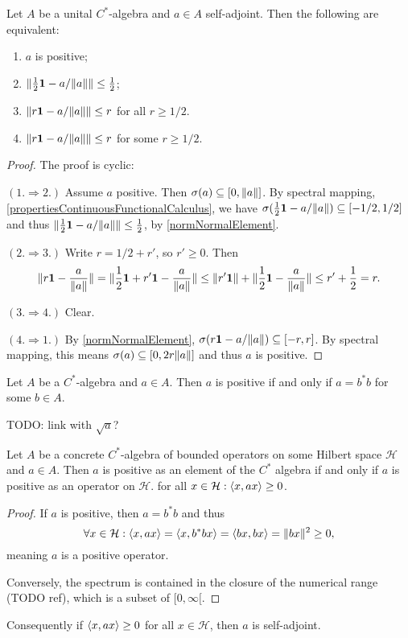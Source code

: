 \begin{lemma} \label{positivityDistanceToNorm}
Let $A$ be a unital $C^*$-algebra and $a\in A$ self-adjoint. Then the following are equivalent:
\begin{enumerate}
\item $a$ is positive;
\item $\lVert\frac{1}{2}\boldsymbol{\mathrm{1}} - a / \lVert a\rVert\rVert \leq \frac{1}{2}$;
\item $\lVert r\boldsymbol{\mathrm{1}} - a / \lVert a\rVert\rVert \leq r$ for all $r\geq 1/2$.
\item $\lVert r\boldsymbol{\mathrm{1}} - a / \lVert a\rVert\rVert \leq r$ for some $r\geq 1/2$.
\end{enumerate}
\end{lemma}
\begin{proof}
The proof is cyclic:

$(1.\Rightarrow 2.)$ Assume $a$ positive. Then $\sigma(a) \subseteq [0,\lVert a\rVert]$. By spectral mapping, \ref{propertiesContinuousFunctionalCalculus}, we have $\sigma(\frac{1}{2}\boldsymbol{\mathrm{1}} - a / \lVert a\rVert) \subseteq [-1/2, 1/2]$ and thus $\lVert\frac{1}{2}\boldsymbol{\mathrm{1}} - a / \lVert a\rVert\rVert \leq \frac{1}{2}$, by \ref{normNormalElement}.

$(2.\Rightarrow 3.)$ Write $r = 1/2 + r'$, so $r'\geq 0$. Then
\[ \lVert r\boldsymbol{\mathrm{1}} - \frac{a}{\lVert a\rVert}\rVert = \lVert\frac{1}{2}\boldsymbol{\mathrm{1}} + r'\boldsymbol{\mathrm{1}} - \frac{a}{\lVert a\rVert}\rVert \leq \lVert r'\boldsymbol{\mathrm{1}}\rVert+ \lVert\frac{1}{2}\boldsymbol{\mathrm{1}} - \frac{a}{\lVert a\rVert}\rVert \leq r' + \frac{1}{2} = r. \]

$(3.\Rightarrow 4.)$ Clear.

$(4.\Rightarrow 1.)$ By \ref{normNormalElement}, $\sigma(r\boldsymbol{\mathrm{1}} - a / \lVert a\rVert) \subseteq [-r, r]$. By spectral mapping, this means $\sigma(a) \subseteq [0, 2r\lVert a\rVert]$ and thus $a$ is positive.
\end{proof}

\begin{proposition}\label{existenceSquareRoot}
Let $A$ be a $C^*$-algebra and $a\in A$. Then $a$ is positive \textup{if and only if} $a = b^*b$ for some $b\in A$.
\end{proposition}
TODO: link with $\sqrt{a}$?
\begin{corollary}
Let $A$ be a concrete $C^*$-algebra of bounded operators on some Hilbert space $\mathcal{H}$ and $a\in A$. Then $a$ is positive as an element of the $C^*$ algebra \textup{if and only if} $a$ is positive as an operator on $\mathcal{H}$. for all $x\in \mathcal{H}: \left\langle x,ax \right\rangle\geq 0$.
\end{corollary}
\begin{proof}
If $a$ is positive, then $a = b^*b$ and thus
\[ \forall x\in \mathcal{H}: \left\langle x,ax \right\rangle = \left\langle x, b^*bx \right\rangle = \left\langle bx,bx \right\rangle = \lVert bx\rVert^2 \geq 0, \]
meaning $a$ is a positive operator.

Conversely, the spectrum is contained in the closure of the numerical range (TODO ref), which is a subset of $[0,\infty[$.
\end{proof}
Consequently if $\left\langle x,ax \right\rangle\geq 0$ for all $x\in\mathcal{H}$, then $a$ is self-adjoint.

